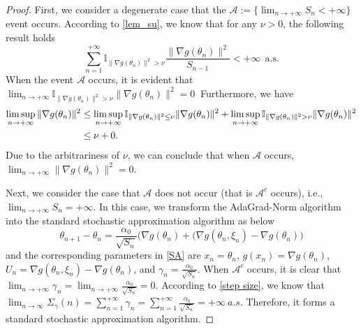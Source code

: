 \documentclass[standalone]{article}
\begin{document}
\begin{proof}%
First, we consider a degenerate case that the $\mathcal{A}:=\big\{\lim_{n\rightarrow+\infty}S_{n}<+\infty\big\} $ event occurs.
According to \cref{lem_su}, we know that for any \( \nu > 0\), the following result holds
\[\sum_{n=1}^{+\infty}\mathbb{I}_{\|\nabla g(\theta_{n})\|^{2}> \nu}\frac{\|\nabla g(\theta_{n})\|^{2}}{S_{n-1}} < +\infty\ \ \text{a.s.}\]
When the event \(\mathcal{A}\) occurs, it is evident that \(\lim_{n\rightarrow+\infty}\mathbb{I}_{\|\nabla g(\theta_{n})\|^{2}>\nu}\|\nabla g(\theta_{n})\|^{2}=0\ \)  Furthermore, we have
\begin{align*}
\limsup_{n\rightarrow+\infty}\|\nabla g(\theta_{n})\|^{2} &\le \limsup_{n\rightarrow+\infty}\mathbb{I}_{\|\nabla g(\theta_{n})\|^{2}\le\nu}\|\nabla g(\theta_{n})\|^{2}+\limsup_{n\rightarrow+\infty}\mathbb{I}_{\|\nabla g(\theta_{n})\|^{2}>\nu}\|\nabla g(\theta_{n})\|^{2} \notag \\
& \le \nu+0.
\end{align*}
Due to the arbitrariness of \(\nu\), we can conclude that when \(\mathcal{A}\) occurs, \(\lim_{n\rightarrow+\infty}\|\nabla g(\theta_{n})\|^{2} = 0.\) 

Next, we consider the case that  \(\mathcal{A}\) does not occur (that is $\mathcal{A}^{c}$ occurs), i.e., \(\lim_{n\rightarrow+\infty}S_{n}=+\infty.\) In this case, we transform the AdaGrad-Norm algorithm into the standard stochastic approximation algorithm as below
\[\theta_{n+1}-\theta_{n}=\frac{\alpha_{0}}{\sqrt{S_{n}}}\big(\nabla g(\theta_{n})+(\nabla g(\theta_{n},\xi_{n})-\nabla g(\theta_{n})\big)\] and the corresponding parameters in \cref{SA} are \(x_{n} = \theta_{n}\), \(g(x_n) = \nabla g(\theta_{n})\), \(U_{n} = \nabla g(\theta_{n}, \xi_{n}) - \nabla g(\theta_{n})\), and \(\gamma_{n} = \frac{\alpha_{0}}{\sqrt{S_{n}}}\). When \(\mathcal{A}^{c}\) occurs, it is clear that \(\lim_{n\rightarrow+\infty} \gamma_n = \lim_{n\rightarrow+\infty}\frac{\alpha_{0}}{\sqrt{S_{n}}}=0\). According to \cref{step size}, we know that \( \lim_{n \rightarrow \infty}\Sigma_{\gamma}(n) = \sum_{n=1}^{+\infty} \gamma_n = \sum_{n=1}^{+\infty}\frac{\alpha_{0}}{\sqrt{S_{n}}} = +\infty\ a.s.\) Therefore, it forms a standard stochastic approximation algorithm. 


\end{proof}
\end{document}
